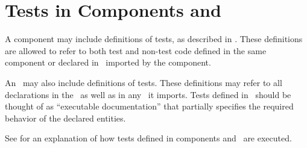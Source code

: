 %
%
%
%

\section{Tests in Components and \Apis}

A component may include definitions of tests,
as described in .
These definitions are allowed to refer to both test and non-test code defined in the same
component or declared in \apisN\ imported by the component.

An \apiN\ may also include definitions of tests.
These definitions may refer to all declarations in the \apiN\ as well as in
any \apisN\ it imports. Tests defined in \apisN\ should be thought of as ``executable documentation''
that partially specifies the required behavior of the declared entities.

See  for an explanation of how tests
defined in components and \apisN\ are executed.
